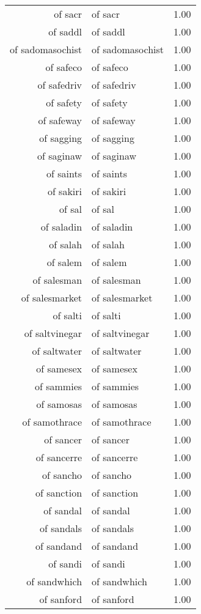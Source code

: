 \begin{table}[ht]
\begin{tabular}{rlr}
  of sacr & of sacr & 1.00 \\ 
  of saddl & of saddl & 1.00 \\ 
  of sadomasochist & of sadomasochist & 1.00 \\ 
  of safeco & of safeco & 1.00 \\ 
  of safedriv & of safedriv & 1.00 \\ 
  of safety & of safety & 1.00 \\ 
  of safeway & of safeway & 1.00 \\ 
  of sagging & of sagging & 1.00 \\ 
  of saginaw & of saginaw & 1.00 \\ 
  of saints & of saints & 1.00 \\ 
  of sakiri & of sakiri & 1.00 \\ 
  of sal & of sal & 1.00 \\ 
  of saladin & of saladin & 1.00 \\ 
  of salah & of salah & 1.00 \\ 
  of salem & of salem & 1.00 \\ 
  of salesman & of salesman & 1.00 \\ 
  of salesmarket & of salesmarket & 1.00 \\ 
  of salti & of salti & 1.00 \\ 
  of saltvinegar & of saltvinegar & 1.00 \\ 
  of saltwater & of saltwater & 1.00 \\ 
  of samesex & of samesex & 1.00 \\ 
  of sammies & of sammies & 1.00 \\ 
  of samosas & of samosas & 1.00 \\ 
  of samothrace & of samothrace & 1.00 \\ 
  of sancer & of sancer & 1.00 \\ 
  of sancerre & of sancerre & 1.00 \\ 
  of sancho & of sancho & 1.00 \\ 
  of sanction & of sanction & 1.00 \\ 
  of sandal & of sandal & 1.00 \\ 
  of sandals & of sandals & 1.00 \\ 
  of sandand & of sandand & 1.00 \\ 
  of sandi & of sandi & 1.00 \\ 
  of sandwhich & of sandwhich & 1.00 \\ 
  of sanford & of sanford & 1.00 \\ 

\end{tabular}
\end{table}
